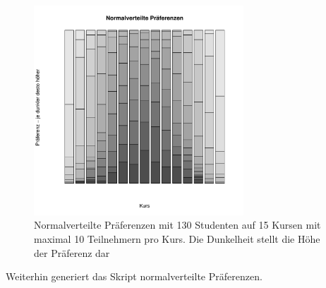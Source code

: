 			\begin{figure}
				\centering
				\includegraphics[width=0.7\textwidth]{./testing/images/NormalDistPreferencesDist.jpg}
				\caption{Normalverteilte Präferenzen mit 130 Studenten auf 15 Kursen mit maximal 10 Teilnehmern pro Kurs. Die Dunkelheit stellt die Höhe der Präferenz dar}
				\label{fig:test_norm_distribution}
			\end{figure}
			Weiterhin generiert das Skript normalverteilte Präferenzen.
